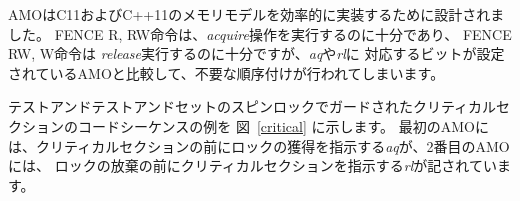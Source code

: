 \begin{commentary}
\begin{comment}
The AMOs were designed to implement the C11 and C++11 memory models
efficiently.  Although the FENCE R, RW instruction suffices to
implement the {\em acquire} operation and FENCE RW, W suffices to
implement {\em release}, both imply additional unnecessary ordering as
compared to AMOs with the corresponding {\em aq} or {\em rl} bit set.
\end{comment}

AMOはC11およびC++11のメモリモデルを効率的に実装するために設計されました。
FENCE R, RW命令は、{\em acquire}操作を実行するのに十分であり、
FENCE RW, W命令は {\em release}実行するのに十分ですが、{\em aq}や{\em rl}に
対応するビットが設定されているAMOと比較して、不要な順序付けが行われてしまいます。

\end{commentary}

\begin{comment}
An example code sequence for a critical section guarded by a
test-and-test-and-set spinlock is shown in Figure~\ref{critical}.  Note the
first AMO is marked {\em aq} to order the lock acquisition before the
critical section, and the second AMO is marked {\em rl} to order
the critical section before the lock relinquishment.
\end{comment}

テストアンドテストアンドセットのスピンロックでガードされたクリティカルセクションのコードシーケンスの例を 図~\ref{critical} に示します。
最初のAMOには、クリティカルセクションの前にロックの獲得を指示する{\em aq}が、2番目のAMOには、
ロックの放棄の前にクリティカルセクションを指示する{\em rl}が記されています。

\begin{comment}
\begin{figure}[h!]
\begin{center}
\begin{verbatim}
        li           t0, 1        # Initialize swap value.
    again:
        lw           t1, (a0)     # Check if lock is held.
        bnez         t1, again    # Retry if held.
        amoswap.w.aq t1, t0, (a0) # Attempt to acquire lock.
        bnez         t1, again    # Retry if held.
        # ...
        # Critical section.
        # ...
        amoswap.w.rl x0, x0, (a0) # Release lock by storing 0.
\end{verbatim}
\end{center}
\caption{Sample code for mutual exclusion.  {\tt a0} contains the address of the lock.}
\label{critical}
\end{figure}
\end{comment}

